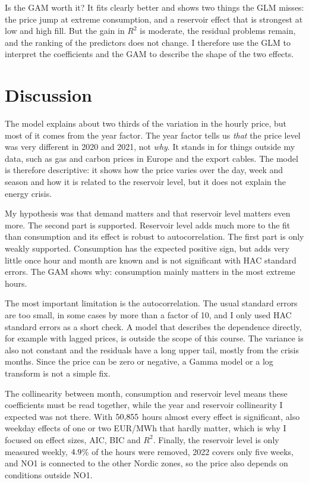 \documentclass[12pt]{article}
\newcommand{\eur}{EUR/MWh}
\begin{document}
Is the GAM worth it? It fits clearly better and shows two things the GLM misses: the price jump at extreme consumption, and a reservoir effect that is strongest at low and high fill. But the gain in $R^2$ is moderate, the residual problems remain, and the ranking of the predictors does not change. I therefore use the GLM to interpret the coefficients and the GAM to describe the shape of the two effects.

\section{Discussion}\label{sec:discussion}

The model explains about two thirds of the variation in the hourly price, but most of it comes from the year factor. The year factor tells us \emph{that} the price level was very different in 2020 and 2021, not \emph{why}. It stands in for things outside my data, such as gas and carbon prices in Europe and the export cables. The model is therefore descriptive: it shows how the price varies over the day, week and season and how it is related to the reservoir level, but it does not explain the energy crisis.

My hypothesis was that demand matters and that reservoir level matters even more. The second part is supported. Reservoir level adds much more to the fit than consumption and its effect is robust to autocorrelation. The first part is only weakly supported. Consumption has the expected positive sign, but adds very little once hour and month are known and is not significant with HAC standard errors. The GAM shows why: consumption mainly matters in the most extreme hours.

The most important limitation is the autocorrelation. The usual standard errors are too small, in some cases by more than a factor of 10, and I only used HAC standard errors as a short check. A model that describes the dependence directly, for example with lagged prices, is outside the scope of this course. The variance is also not constant and the residuals have a long upper tail, mostly from the crisis months. Since the price can be zero or negative, a Gamma model or a log transform is not a simple fix.

The collinearity between month, consumption and reservoir level means these coefficients must be read together, while the year and reservoir collinearity I expected was not there. With $50{,}855$ hours almost every effect is significant, also weekday effects of one or two \eur{} that hardly matter, which is why I focused on effect sizes, AIC, BIC and $R^2$. Finally, the reservoir level is only measured weekly, $4.9$\% of the hours were removed, 2022 covers only five weeks, and NO1 is connected to the other Nordic zones, so the price also depends on conditions outside NO1.
\end{document}
